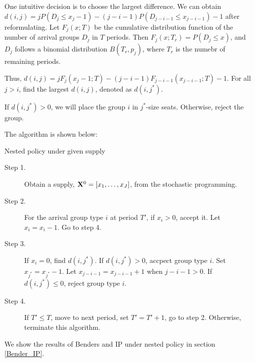 One intuitive decision is to choose the largest difference.
We can obtain $d(i,j) = j P(D_{j} \leq x_{j} -1) - (j-i-1)P(D_{j-i-1} \leq x_{j-i-1}) -1$ after reformulating. 
Let $F_{j}(x;T)$ be the cumulative distribution function of the number of arrival groups $D_{j}$ in $T$ periods. Then $F_{j}(x; T_{r}) = P(D_{j} \leq x)$, and $D_{j}$ follows a binomial distribution $B(T_{r}, p_{j})$, where $T_{r}$ is the numebr of remaining periods.

Thus, $d(i,j) = j F_{j}(x_{j}-1; T) - (j-i-1) F_{j-i-1}(x_{j-i-1}; T) -1$. For all $j >i$, find the largest $d(i,j)$, denoted as $d(i,j^{*})$.

If $d(i,j^{*}) >0$, we will place the group $i$ in $j^{*}$-size seats. Otherwise, reject the group.

The algorithm is shown below:

\begin{algorithm}[H]
  \caption{Nested policy under given supply}\label{algo_nested_policy}
  \begin{description}
    \item[Step 1.] Obtain a supply, $\mathbf{X}^{0} = [x_1,\ldots,x_{J}]$, from the stochastic programming.
    \item[Step 2.] For the arrival group type $i$ at period $T{'}$, if $x_{i} > 0$, accept it. Let $x_{i} = x_{i} -1$. Go to step 4.
    \item[Step 3.] If $x_{i} = 0$, find $d(i,j^{*})$. If $d(i,j^{*})>0$, accpect group type $i$. Set $x_{j^{*}} = x_{j^{*}} -1$. Let $x_{j-i-1} = x_{j-i-1} + 1$ when $j-i-1>0$. If $d(i,j^{*}) \leq 0$, reject group type $i$.
    \item[Step 4.] If $T{'} \leq T$, move to next period, set $T{'} = T{'}+1$, go to step 2. Otherwise, terminate this algorithm.
  \end{description}
\end{algorithm}


We show the results of Benders and IP under nested policy in section \ref{Bender_IP}.


